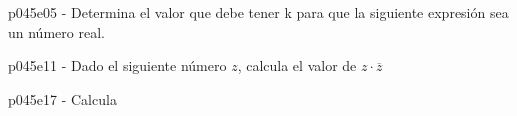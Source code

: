 \documentclass[spanish, 11pt]{exam}
\begin{document}
\begin{questions}
\begin{multicols}{2}
        \end{multicols}
        \question p045e05 - Determina el valor que debe tener k para que la siguiente expresión sea un número real.
        \begin{multicols}{2} 
        \end{multicols}
        \question p045e11 - Dado el siguiente número $z$, calcula el valor de $z\cdot\overline{z}$
        \begin{multicols}{2} 
        \end{multicols}
        \question p045e17 - Calcula
        \begin{multicols}{2} 

\end{multicols}
\end{questions}
\end{document}

